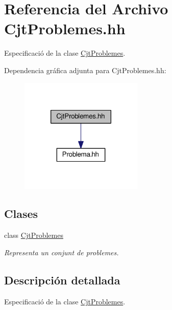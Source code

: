 \hypertarget{_cjt_problemes_8hh}{}\section{Referencia del Archivo Cjt\+Problemes.\+hh}
\label{_cjt_problemes_8hh}


Especificació de la clase \mbox{\hyperlink{class_cjt_problemes}{Cjt\+Problemes}}.  


Dependencia gráfica adjunta para Cjt\+Problemes.\+hh\+:
\nopagebreak
\begin{figure}[H]
\begin{center}
\leavevmode
\includegraphics[width=166pt]{_cjt_problemes_8hh__incl}
\end{center}
\end{figure}
\subsection*{Clases}
\begin{DoxyCompactItemize}
\item 
class \mbox{\hyperlink{class_cjt_problemes}{Cjt\+Problemes}}
\begin{DoxyCompactList}\small\item\em Representa un conjunt de problemes. \end{DoxyCompactList}\end{DoxyCompactItemize}


\subsection{Descripción detallada}
Especificació de la clase \mbox{\hyperlink{class_cjt_problemes}{Cjt\+Problemes}}. 

